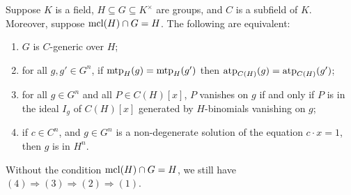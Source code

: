 \begin{prop}\label{Equiv2}
 Suppose $K$ is a field, $H \subseteq G \subseteq K^\times $ are groups, and $C$ is a subfield of $K$. Moreover, suppose $\mathrm{mcl}(H)\cap G = H$. The following are equivalent:
\begin{enumerate}

\item $G$ is $C$-generic over \(H\);

\item for all $g, g' \in G^n$, if \( \mathrm{mtp}_H(g)= \mathrm{mtp}_H(g')\) then \( \mathrm{atp}_{C(H)}(g)= \mathrm{atp}_{C(H)}(g') \);

\item for all $ g \in G^n$ and all $P\in C(H)[x]$, $P$ vanishes on $g$ if and only if $P$ is in the ideal $I_g$ of $C(H)[x]$ generated by $H$-binomials vanishing on $g$;



\item if $c\in C^n$, and \(g \in G^n\) is a non-degenerate solution of the equation \( c\cdot x =1 \), then \(g\) is in \(H^n\).

\end{enumerate}
Without the condition  $\mathrm{mcl}(H)\cap G = H$, we still have \((4) \Rightarrow (3) \Rightarrow (2) \Rightarrow (1)\).
\end{prop}



